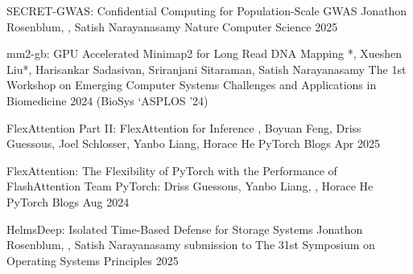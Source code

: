 \PubListEnd




\PubItem
{SECRET-GWAS: Confidential Computing for Population-Scale GWAS} %
{Jonathon Rosenblum, , Satish Narayanasamy} %
{Nature Computer Science} %
{2025} %
{} %
{} %

\resumeItemListStart
{}
\resumeItemListEnd

\PubListEnd



\PubItemCV
{mm2-gb: GPU Accelerated Minimap2 for Long Read DNA Mapping} %
{*, Xueshen Liu*, Harisankar Sadasivan, Sriranjani Sitaraman, Satish Narayanasamy} %
{The 1st Workshop on
Emerging Computer Systems Challenges and Applications in Biomedicine} %
{2024} %
{(BioSys \char`\@ ASPLOS '24)} %
{} %

\PubListEnd



\PubItemCV
{FlexAttention Part II: FlexAttention for Inference} %
{, Boyuan Feng, Driss Guessous, Joel Schlosser, Yanbo Liang, Horace He} %
{PyTorch Blogs} %
{Apr 2025} %
{} %
{} %

\PubItemCV
{FlexAttention: The Flexibility of PyTorch with the Performance of FlashAttention} %
{Team PyTorch: Driss Guessous, Yanbo Liang, , Horace He} %
{PyTorch Blogs} %
{Aug 2024} %
{} %
{} %

\PubListEnd



\PubItemCV
{HelmsDeep: Isolated Time-Based Defense for Storage Systems} %
{Jonathon Rosenblum, , Satish Narayanasamy} %
{submission to The 31st Symposium on Operating Systems Principles} %
{2025} %
{} %
{} %

\PubListEnd

